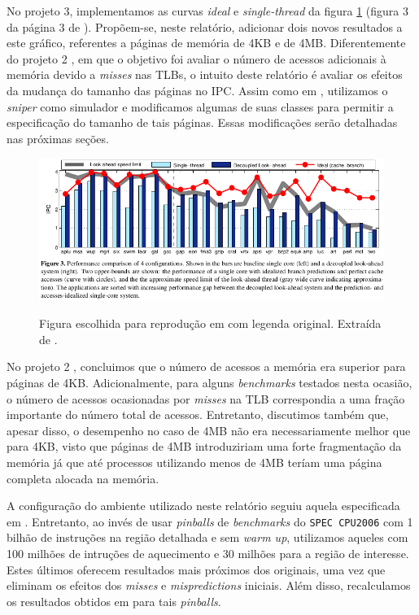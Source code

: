 \documentclass[12pt]{article}
\begin{document}
No projeto 3, implementamos as curvas \textit{ideal} e \textit{single-thread} da
figura \ref{fig:artigo} (figura 3 da página 3 de \cite{artigo}). Propõem-se,
neste relatório, adicionar dois novos resultados a este gráfico, referentes a
páginas de memória de 4KB e de 4MB.
Diferentemente do projeto 2 \cite{relatorio2}, em que o objetivo foi avaliar o
número de acessos adicionais à  memória devido a \textit{misses} nas TLBs, o
intuito deste relatório é avaliar os efeitos da mudança do tamanho das páginas
no IPC. Assim como em \cite{relatorio3}, utilizamos o \textit{sniper} como
simulador e modificamos algumas de suas classes para permitir a especificação do
tamanho de tais páginas. Essas modificações serão detalhadas nas próximas
seções.

\begin{figure}[h!]
  \centering
  \includegraphics[width=\textwidth]{img/fig3}%
  \label{fig:artigo}%
  \caption{Figura escolhida para reprodução em \cite{relatorio3} com legenda
  original. Extraída de \cite{artigo}.}
\end{figure}

No projeto 2 \cite{relatorio2}, concluimos que o número de acessos a memória era
superior para páginas de 4KB. Adicionalmente, para alguns \textit{benchmarks}
testados nesta ocasião, o número de acessos ocasionadas por \textit{misses} na TLB
correspondia a uma fração importante do número total de acessos. Entretanto,
discutimos também que, apesar disso, o desempenho no caso de 4MB não era
necessariamente melhor que para 4KB, visto que páginas de 4MB
introduziriam uma forte fragmentação da memória já que até processos
utilizando menos de 4MB teríam uma página completa alocada na memória. 

A configuração do ambiente utilizado neste relatório seguiu aquela especificada
em \cite{relatorio3}. Entretanto, ao invés de usar \textit{pinballs} de
\textit{benchmarks} do \texttt{SPEC CPU2006} com 1 bilhão de instruções na
região detalhada e sem \textit{warm up}, utilizamos aqueles com 100 milhões de
intruções de aquecimento e 30 milhões para a região de interesse. Estes últimos
oferecem resultados mais próximos dos originais, uma vez que eliminam os efeitos 
dos \textit{misses} e \textit{mispredictions} iniciais. Além disso, recalculamos
os resultados obtidos em \cite{relatorio3} para tais \textit{pinballs}.
\end{document}

